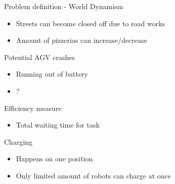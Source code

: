 \begin{frame}{Problem definition - World}
    Dynamism
    \begin{itemize}
        \item Streets can become closed off due to road works
        \item Amount of pizzerias can increase/decrease
    \end{itemize}

    Potential AGV crashes
    \begin{itemize}
        \item Running out of battery
        \item ?
    \end{itemize}

    Efficiency measure
    \begin{itemize}
        \item Total waiting time for task
    \end{itemize}

    Charging
    \begin{itemize}
        \item Happens on one position
        \item Only limited amount of robots can charge at once
    \end{itemize}
\end{frame}
